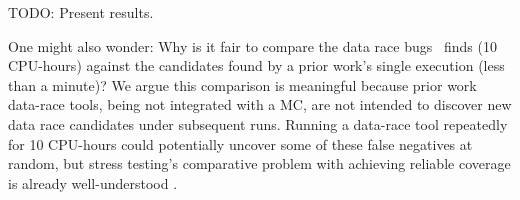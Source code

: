 
TODO: Present results.

One might also wonder: Why is it fair to compare the data race bugs \quicksand~finds (10 CPU-hours)
against the candidates found by a prior work's single execution (less than a minute)?
We argue this comparison is meaningful because prior work data-race tools, being not integrated with a MC,
are not intended to discover new data race candidates under subsequent runs.
Running a data-race tool repeatedly for 10 CPU-hours could potentially uncover some of these false negatives at random,
but stress testing's comparative problem with achieving reliable coverage is already well-understood
\cite{chess-icb,gambit}.



